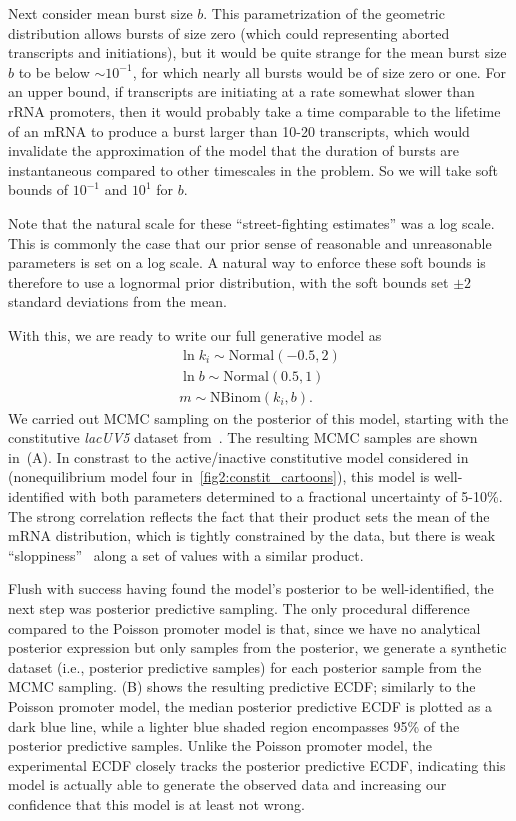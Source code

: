 Next consider mean burst size $b$. This parametrization of the
geometric distribution allows bursts of size zero (which could
representing aborted transcripts and initiations), but it would
be quite strange for the mean burst size $b$ to be below
$\sim10^{-1}$, for which nearly all bursts would be of size zero
or one. For an upper bound, if transcripts are initiating at a
rate somewhat slower than rRNA promoters, then it would probably
take a time comparable to the lifetime of an mRNA to produce a
burst larger than 10-20 transcripts, which would invalidate the
approximation of the model that the duration of bursts are
instantaneous compared to other timescales in the problem. So we
will take soft bounds of $10^{-1}$ and $10^1$ for $b$.

Note that the natural scale for these ``street-fighting estimates''
was a log scale. This is commonly the case that our prior sense
of reasonable and unreasonable parameters is set on a log scale.
A natural way to enforce these soft bounds is therefore to use a
lognormal prior distribution, with the soft bounds set $\pm2$
standard deviations from the mean.

With this, we are ready to write our full generative model as
\begin{equation}
\begin{split}
\ln k_i \sim \text{Normal}(-0.5, 2)
\\
\ln b \sim \text{Normal}(0.5, 1)
\\
m \sim \text{NBinom}(k_i, b).
\end{split}
\end{equation}
We carried out MCMC sampling on the posterior of this model, starting
with the constitutive \textit{lacUV5} dataset from~\cite{Jones2014}.
The resulting MCMC samples are shown in~(A).
In constrast to the active/inactive constitutive model considered
in~\cite{Razo-Mejia2020} (nonequilibrium model four
in~\ref{fig2:constit_cartoons}), this model is well-identified
with both parameters determined to a fractional uncertainty of 5-10\%.
The strong correlation reflects the fact that their product sets
the mean of the mRNA distribution, which is tightly constrained
by the data, but there is weak ``sloppiness''~\cite{Transtrum2015}
along a set of values with a similar product.

Flush with success having found the model's posterior to be
well-identified, the next step was posterior predictive sampling.
The only procedural difference compared to the Poisson promoter
model is that, since we have no analytical posterior expression
but only samples from the posterior, we generate a synthetic
dataset (i.e., posterior predictive samples) for each posterior
sample from the MCMC sampling. (B)
shows the resulting predictive ECDF; similarly to the Poisson
promoter model, the median posterior predictive ECDF is plotted
as a dark blue line, while a lighter blue shaded region
encompasses 95\% of the posterior predictive samples. Unlike the
Poisson promoter model, the experimental ECDF closely tracks the
posterior predictive ECDF, indicating this model is actually able
to generate the observed data and increasing our confidence that
this model is at least not wrong.

